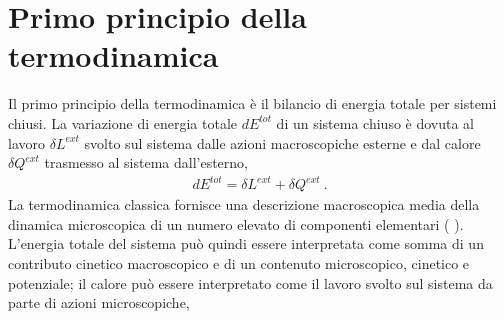 \documentclass[letterpaper,10pt,italian]{jupyterBook}
\begin{document}
\section{Primo principio della termodinamica}
\label{\detokenize{ch/thermodynamics/principles-first:primo-principio-della-termodinamica}}\label{\detokenize{ch/thermodynamics/principles-first:physics-hs-thermodynamics-foundation-principles-first}}\label{\detokenize{ch/thermodynamics/principles-first::doc}}
\sphinxAtStartPar
Il primo principio della termodinamica è il bilancio di energia totale per sistemi chiusi. La variazione di energia totale \(d E^{tot}\) di un sistema chiuso è dovuta al lavoro \(\delta L^{ext}\) svolto sul sistema dalle azioni macroscopiche esterne e dal calore \(\delta Q^{ext}\) trasmesso al sistema dall’esterno,
\begin{equation*}
\begin{split}d E^{tot} = \delta L^{ext} + \delta Q^{ext} \ .\end{split}
\end{equation*}
\sphinxAtStartPar
La termodinamica classica fornisce una descrizione macroscopica media della dinamica microscopica di un numero elevato di componenti elementari ( ). L’energia totale del sistema può quindi essere interpretata come somma di un contributo cinetico macroscopico e di un contenuto microscopico, cinetico e potenziale; il calore può essere interpretato come il lavoro svolto sul sistema da parte di azioni microscopiche,



\sphinxstepscope
\end{document}
